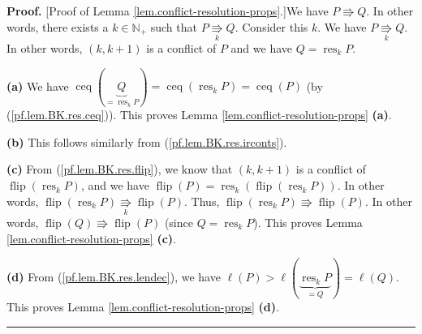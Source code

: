 \documentclass[numbers=enddot,12pt,final,onecolumn,notitlepage]{scrartcl}%
\theoremstyle{definition}
\newenvironment{proof}[1][Proof]{\noindent\textbf{#1.} }{\ \rule{0.5em}{0.5em}}
\newenvironment{vershort}{}{}
\begin{document}
\begin{vershort}
\begin{proof}
[Proof of Lemma \ref{lem.conflict-resolution-props}.]We have $P\Rrightarrow
Q$. In other words, there exists a $k\in\mathbb{N}_{+}$ such that
$P\underset{k}{\Rrightarrow}Q$. Consider this $k$. We have
$P\underset{k}{\Rrightarrow}Q$. In other words, $\left(  k,k+1\right)  $ is a
conflict of $P$ and we have $Q=\operatorname*{res}\nolimits_{k}P$.

\textbf{(a)} We have $\operatorname*{ceq}\left(  \underbrace{Q}%
_{=\operatorname*{res}\nolimits_{k}P}\right)  =\operatorname*{ceq}\left(
\operatorname*{res}\nolimits_{k}P\right)  =\operatorname*{ceq}\left(
P\right)  $ (by (\ref{pf.lem.BK.res.ceq})). This proves Lemma
\ref{lem.conflict-resolution-props} \textbf{(a)}.

\textbf{(b)} This follows similarly from (\ref{pf.lem.BK.res.irconts}).

\textbf{(c)} From (\ref{pf.lem.BK.res.flip}), we know that $\left(
k,k+1\right)  $ is a conflict of $\operatorname*{flip}\left(
\operatorname*{res}\nolimits_{k}P\right)  $, and we have $\operatorname*{flip}%
\left(  P\right)  =\operatorname*{res}\nolimits_{k}\left(
\operatorname*{flip}\left(  \operatorname*{res}\nolimits_{k}P\right)  \right)
$. In other words, $\operatorname*{flip}\left(  \operatorname*{res}%
\nolimits_{k}P\right)  \underset{k}{\Rrightarrow}\operatorname*{flip}\left(
P\right)  $. Thus, $\operatorname*{flip}\left(  \operatorname*{res}%
\nolimits_{k}P\right)  \Rrightarrow\operatorname*{flip}\left(  P\right)  $. In
other words, $\operatorname*{flip}\left(  Q\right)  \Rrightarrow
\operatorname*{flip}\left(  P\right)  $ (since $Q=\operatorname*{res}%
\nolimits_{k}P$). This proves Lemma \ref{lem.conflict-resolution-props}
\textbf{(c)}.

\textbf{(d)} From (\ref{pf.lem.BK.res.lendec}), we have $\ell\left(  P\right)
>\ell\left(  \underbrace{\operatorname*{res}\nolimits_{k}P}_{=Q}\right)
=\ell\left(  Q\right)  $. This proves Lemma
\ref{lem.conflict-resolution-props} \textbf{(d)}.
\end{proof}
\end{vershort}
\end{document}
